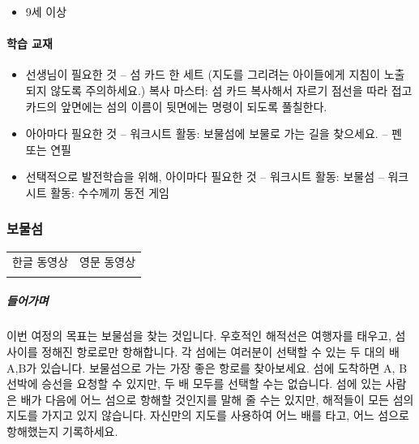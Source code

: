 \documentclass[]{article}
\begin{document}
\begin{itemize}
\itemsep1pt\parskip0pt
\item
  9세 이상
\end{itemize}

\mbox{}\paragraph{학습 교재}\label{section-158}

\begin{itemize}
\itemsep1pt\parskip0pt
\item
  선생님이 필요한 것 -- 섬 카드 한 세트 (지도를 그리려는 아이들에게
  지침이 노출되지 않도록 주의하세요.) 복사 마스터: 섬 카드 복사해서
  자르기 점선을 따라 접고 카드의 앞면에는 섬의 이름이 뒷면에는 명령이
  되도록 풀칠한다.
\item
  아아마다 필요한 것 -- 워크시트 활동: 보물섬에 보물로 가는 길을
  찾으세요. -- 펜 또는 연필
\item
  선택적으로 발전학습을 위해, 아이마다 필요한 것 -- 워크시트 활동:
  보물섬 -- 워크시트 활동: 수수께끼 동전 게임
\end{itemize}

\subsubsection{보물섬}\label{section-159}

\begin{longtable}[c]{@{}ll@{}}
\toprule
\begin{minipage}[t]{0.47\columnwidth}\raggedright\strut
한글 동영상
\strut\end{minipage} &
\begin{minipage}[t]{0.47\columnwidth}\raggedright\strut
영문 동영상
\strut\end{minipage}\tabularnewline
\begin{minipage}[t]{0.47\columnwidth}\raggedright\strut
\strut\end{minipage} &
\begin{minipage}[t]{0.47\columnwidth}\raggedright\strut
\strut\end{minipage}\tabularnewline
\bottomrule
\end{longtable}

\subparagraph{들어가며}\label{section-160}

이번 여정의 목표는 보물섬을 찾는 것입니다. 우호적인 해적선은 여행자를
태우고, 섬 사이를 정해진 항로로만 항해합니다. 각 섬에는 여러분이 선택할
수 있는 두 대의 배 A,B가 있습니다. 보물섬으로 가는 가장 좋은 항로를
찾아보세요. 섬에 도착하면 A, B 선박에 승선을 요청할 수 있지만, 두 배
모두를 선택할 수는 없습니다. 섬에 있는 사람은 배가 다음에 어느 섬으로
항해할 것인지를 말해 줄 수는 있지만, 해적들이 모든 섬의 지도를 가지고
있지 않습니다. 자신만의 지도를 사용하여 어느 배를 타고, 어느 섬으로
항해했는지 기록하세요.
\end{document}
